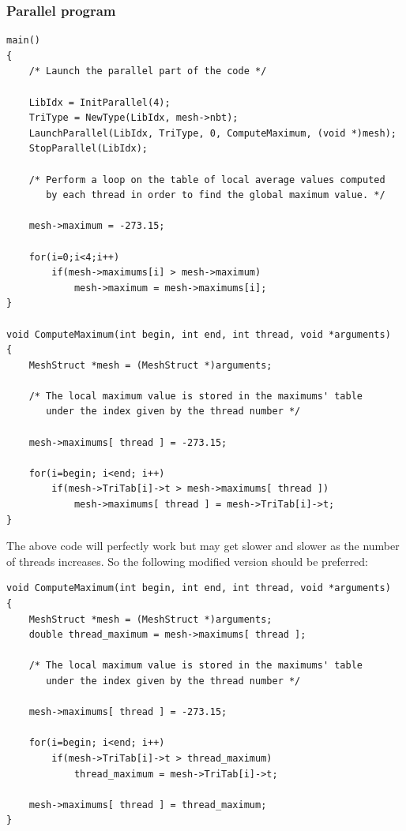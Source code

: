 \documentclass[a4paper,12pt]{article}
\begin{document}
\subsubsection{Parallel program}

\begin{tt}
\begin{verbatim}
main()
{
    /* Launch the parallel part of the code */

    LibIdx = InitParallel(4);
    TriType = NewType(LibIdx, mesh->nbt);
    LaunchParallel(LibIdx, TriType, 0, ComputeMaximum, (void *)mesh);
    StopParallel(LibIdx);

    /* Perform a loop on the table of local average values computed
       by each thread in order to find the global maximum value. */

    mesh->maximum = -273.15;

    for(i=0;i<4;i++)
        if(mesh->maximums[i] > mesh->maximum)
            mesh->maximum = mesh->maximums[i];
}

void ComputeMaximum(int begin, int end, int thread, void *arguments)
{
    MeshStruct *mesh = (MeshStruct *)arguments;

    /* The local maximum value is stored in the maximums' table
       under the index given by the thread number */

    mesh->maximums[ thread ] = -273.15;

    for(i=begin; i<end; i++)
        if(mesh->TriTab[i]->t > mesh->maximums[ thread ])
            mesh->maximums[ thread ] = mesh->TriTab[i]->t;
}
\end{verbatim}
\end{tt}
\normalfont

The above code will perfectly work but may get slower and slower as the number of threads increases. So the following modified version should be preferred:

\begin{tt}
\begin{verbatim}
void ComputeMaximum(int begin, int end, int thread, void *arguments)
{
    MeshStruct *mesh = (MeshStruct *)arguments;
    double thread_maximum = mesh->maximums[ thread ];

    /* The local maximum value is stored in the maximums' table
       under the index given by the thread number */

    mesh->maximums[ thread ] = -273.15;

    for(i=begin; i<end; i++)
        if(mesh->TriTab[i]->t > thread_maximum)
            thread_maximum = mesh->TriTab[i]->t;

    mesh->maximums[ thread ] = thread_maximum;
}
\end{verbatim}
\end{tt}
\normalfont
\end{document}

